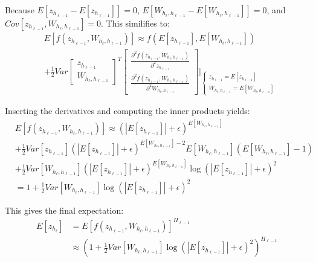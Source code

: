 Because $E[z_{h_{\ell-1}} - E[z_{h_{\ell-1}}]] = 0$, $E[W_{h_{\ell}, h_{\ell-1}} - E[W_{h_{\ell}, h_{\ell-1}}]] = 0$, and $Cov[z_{h_{\ell-1}}, W_{h_{\ell}, h_{\ell-1}}] = 0$. This similifies to:
\begin{equation}
\begin{aligned}
&E[f(z_{h_{\ell-1}}, W_{h_{\ell}, h_{\ell-1}})] \approx
f(E[z_{h_{\ell-1}}], E[W_{h_{\ell}, h_{\ell-1}}])\\
&+ \frac{1}{2} Var\begin{bmatrix}
z_{h_{\ell-1}} \\ W_{h_{\ell}, h_{\ell-1}}
\end{bmatrix}^T \begin{bmatrix}
\frac{\partial^2 f(z_{h_{\ell-1}}, W_{h_{\ell}, h_{\ell-1}})}{\partial^2 z_{h_{\ell-1}}} \\
\frac{\partial^2 f(z_{h_{\ell-1}}, W_{h_{\ell}, h_{\ell-1}})}{\partial^2 W_{h_{\ell}, h_{\ell-1}}}
\end{bmatrix} \Bigg\rvert_{
\begin{cases}
z_{h_{\ell-1}} = E[z_{h_{\ell-1}}] \\
W_{h_{\ell}, h_{\ell-1}} = E[W_{h_{\ell}, h_{\ell-1}}]
\end{cases}
}
\end{aligned}
\end{equation}

Inserting the derivatives and computing the inner products yields:
\begin{equation}
\begin{aligned}
&E[f(z_{h_{\ell-1}}, W_{h_{\ell}, h_{\ell-1}})] \approx
(|E[z_{h_{\ell-1}}]| + \epsilon)^{E[W_{h_{\ell}, h_{\ell-1}}]} \\
&+ \frac{1}{2} Var[z_{h_{\ell-1}}] (|E[z_{h_{\ell-1}}]| + \epsilon)^{E[W_{h_{\ell}, h_{\ell-1}}] - 2} E[W_{h_{\ell}, h_{\ell-1}}] (E[W_{h_{\ell}, h_{\ell-1}}] - 1) \\
&+ \frac{1}{2} Var[W_{h_{\ell}, h_{\ell-1}}] (|E[z_{h_{\ell-1}}]| + \epsilon)^{E[W_{h_{\ell}, h_{\ell-1}}]} \log(|E[z_{h_{\ell-1}}]| + \epsilon)^2 \\
&=1 + \frac{1}{2} Var[W_{h_{\ell}, h_{\ell-1}}] \log(|E[z_{h_{\ell-1}}]| + \epsilon)^2
\end{aligned}
\end{equation}

This gives the final expectation:
\begin{equation}
\begin{aligned}
E[z_{h_\ell}] &= E\left[f(z_{h_{\ell-1}}, W_{h_{\ell}, h_{\ell-1}})\right]^{H_{\ell-1}} \\
&\approx\left(1 + \frac{1}{2} Var[W_{h_{\ell}, h_{\ell-1}}] \log(|E[z_{h_{\ell-1}}]| + \epsilon)^2\right)^{H_{\ell-1}}
\end{aligned}
\end{equation}

